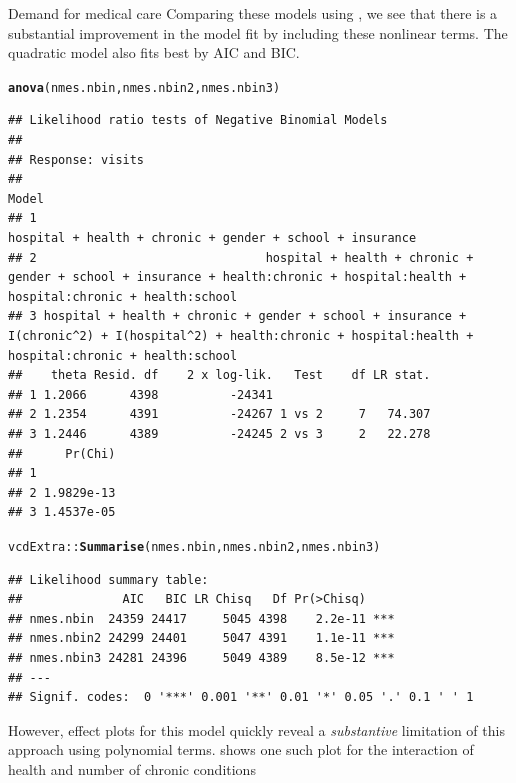 \documentclass[11pt]{book}\usepackage[]{graphicx}\usepackage[]{color}
\makeatletter
\newcommand{\hlopt}[1]{\textcolor[rgb]{0,0,0}{#1}}%
\newcommand{\hlstd}[1]{\textcolor[rgb]{0.345,0.345,0.345}{#1}}%
\newcommand{\hlkwd}[1]{\textcolor[rgb]{0.737,0.353,0.396}{\textbf{#1}}}%
\newenvironment{kframe}{%
 \def\at@end@of@kframe{}%
 \ifinner\ifhmode%
  \def\at@end@of@kframe{\end{minipage}}%
  \begin{minipage}{\columnwidth}%
 \fi\fi%
 \def\FrameCommand##1{\hskip\@totalleftmargin \hskip-\fboxsep
 \colorbox{shadecolor}{##1}\hskip-\fboxsep
     \hskip-\linewidth \hskip-\@totalleftmargin \hskip\columnwidth}%
 \MakeFramed {\advance\hsize-\width
   \@totalleftmargin\z@ \linewidth\hsize
   \@setminipage}}%
 {\par\unskip\endMakeFramed%
 \at@end@of@kframe}
\newenvironment{knitrout}{}{} %
\renewenvironment{knitrout}{\small\renewcommand{\baselinestretch}{.85}}{} %
\makeatother
\begin{document}
\begin{Example}[nmes3]{Demand for medical care}
\begin{knitrout}
\end{knitrout}
Comparing these models using , we see that there is a substantial improvement in the
model fit by including these nonlinear terms.  The quadratic model also fits best by AIC and BIC.
\begin{knitrout}
\color{fgcolor}\begin{kframe}
\begin{alltt}
\hlkwd{anova}\hlstd{(nmes.nbin, nmes.nbin2, nmes.nbin3)}
\end{alltt}
\begin{verbatim}
## Likelihood ratio tests of Negative Binomial Models
## 
## Response: visits
##                                                                                                                                                            Model
## 1                                                                                                      hospital + health + chronic + gender + school + insurance
## 2                                hospital + health + chronic + gender + school + insurance + health:chronic + hospital:health + hospital:chronic + health:school
## 3 hospital + health + chronic + gender + school + insurance + I(chronic^2) + I(hospital^2) + health:chronic + hospital:health + hospital:chronic + health:school
##    theta Resid. df    2 x log-lik.   Test    df LR stat.
## 1 1.2066      4398          -24341                      
## 2 1.2354      4391          -24267 1 vs 2     7   74.307
## 3 1.2446      4389          -24245 2 vs 3     2   22.278
##      Pr(Chi)
## 1           
## 2 1.9829e-13
## 3 1.4537e-05
\end{verbatim}
\begin{alltt}
\hlstd{vcdExtra}\hlopt{::}\hlkwd{Summarise}\hlstd{(nmes.nbin, nmes.nbin2, nmes.nbin3)}
\end{alltt}
\begin{verbatim}
## Likelihood summary table:
##              AIC   BIC LR Chisq   Df Pr(>Chisq)    
## nmes.nbin  24359 24417     5045 4398    2.2e-11 ***
## nmes.nbin2 24299 24401     5047 4391    1.1e-11 ***
## nmes.nbin3 24281 24396     5049 4389    8.5e-12 ***
## ---
## Signif. codes:  0 '***' 0.001 '**' 0.01 '*' 0.05 '.' 0.1 ' ' 1
\end{verbatim}
\end{kframe}
\end{knitrout}
However, effect plots for this model quickly reveal a \emph{substantive} limitation of this approach using polynomial terms.
 shows one such plot for the interaction of health and number of chronic conditions

\end{Example}
\end{document}
